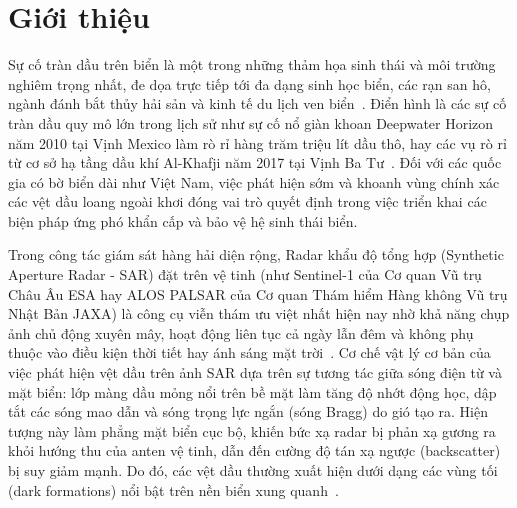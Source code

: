 \section{Giới thiệu}
\label{sec:introduction}

Sự cố tràn dầu trên biển là một trong những thảm họa sinh thái và môi trường nghiêm trọng nhất, đe dọa trực tiếp tới đa dạng sinh học biển, các rạn san hô, ngành đánh bắt thủy hải sản và kinh tế du lịch ven biển~\cite{fingas2014review}. Điển hình là các sự cố tràn dầu quy mô lớn trong lịch sử như sự cố nổ giàn khoan Deepwater Horizon năm 2010 tại Vịnh Mexico làm rò rỉ hàng trăm triệu lít dầu thô, hay các vụ rò rỉ từ cơ sở hạ tầng dầu khí Al-Khafji năm 2017 tại Vịnh Ba Tư~\cite{zhu2022oil}. Đối với các quốc gia có bờ biển dài như Việt Nam, việc phát hiện sớm và khoanh vùng chính xác các vệt dầu loang ngoài khơi đóng vai trò quyết định trong việc triển khai các biện pháp ứng phó khẩn cấp và bảo vệ hệ sinh thái biển.

Trong công tác giám sát hàng hải diện rộng, Radar khẩu độ tổng hợp (Synthetic Aperture Radar - SAR) đặt trên vệ tinh (như Sentinel-1 của Cơ quan Vũ trụ Châu Âu ESA hay ALOS PALSAR của Cơ quan Thám hiểm Hàng không Vũ trụ Nhật Bản JAXA) là công cụ viễn thám ưu việt nhất hiện nay nhờ khả năng chụp ảnh chủ động xuyên mây, hoạt động liên tục cả ngày lẫn đêm và không phụ thuộc vào điều kiện thời tiết hay ánh sáng mặt trời~\cite{brekke2005oil,topouzelis2008oil}. Cơ chế vật lý cơ bản của việc phát hiện vệt dầu trên ảnh SAR dựa trên sự tương tác giữa sóng điện từ và mặt biển: lớp màng dầu mỏng nổi trên bề mặt làm tăng độ nhớt động học, dập tắt các sóng mao dẫn và sóng trọng lực ngắn (sóng Bragg) do gió tạo ra. Hiện tượng này làm phẳng mặt biển cục bộ, khiến bức xạ radar bị phản xạ gương ra khỏi hướng thu của anten vệ tinh, dẫn đến cường độ tán xạ ngược (backscatter) bị suy giảm mạnh. Do đó, các vệt dầu thường xuất hiện dưới dạng các vùng tối (dark formations) nổi bật trên nền biển xung quanh~\cite{yang2025oil}.

